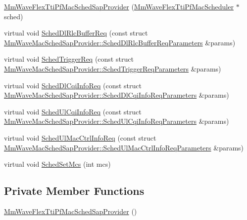 \begin{DoxyCompactItemize}
\item 
\hyperlink{classns3_1_1MmWaveFlexTtiPfMacSchedSapProvider_a828bc790997d2739946319fb5b5c7f0a}{Mm\+Wave\+Flex\+Tti\+Pf\+Mac\+Sched\+Sap\+Provider} (\hyperlink{classns3_1_1MmWaveFlexTtiPfMacScheduler}{Mm\+Wave\+Flex\+Tti\+Pf\+Mac\+Scheduler} $\ast$sched)
\item 
virtual void \hyperlink{classns3_1_1MmWaveFlexTtiPfMacSchedSapProvider_adc673280550b38446e55929c9133e5c8}{Sched\+Dl\+Rlc\+Buffer\+Req} (const struct \hyperlink{structns3_1_1MmWaveMacSchedSapProvider_1_1SchedDlRlcBufferReqParameters}{Mm\+Wave\+Mac\+Sched\+Sap\+Provider\+::\+Sched\+Dl\+Rlc\+Buffer\+Req\+Parameters} \&params)
\item 
virtual void \hyperlink{classns3_1_1MmWaveFlexTtiPfMacSchedSapProvider_a1c7438e1d0ef6529009c46eb471b78d4}{Sched\+Trigger\+Req} (const struct \hyperlink{structns3_1_1MmWaveMacSchedSapProvider_1_1SchedTriggerReqParameters}{Mm\+Wave\+Mac\+Sched\+Sap\+Provider\+::\+Sched\+Trigger\+Req\+Parameters} \&params)
\item 
virtual void \hyperlink{classns3_1_1MmWaveFlexTtiPfMacSchedSapProvider_aa4986d4ed7b33edf36dd767c90407cdb}{Sched\+Dl\+Cqi\+Info\+Req} (const struct \hyperlink{structns3_1_1MmWaveMacSchedSapProvider_1_1SchedDlCqiInfoReqParameters}{Mm\+Wave\+Mac\+Sched\+Sap\+Provider\+::\+Sched\+Dl\+Cqi\+Info\+Req\+Parameters} \&params)
\item 
virtual void \hyperlink{classns3_1_1MmWaveFlexTtiPfMacSchedSapProvider_a58a328f563ba4970a708920c4eb8e4c3}{Sched\+Ul\+Cqi\+Info\+Req} (const struct \hyperlink{structns3_1_1MmWaveMacSchedSapProvider_1_1SchedUlCqiInfoReqParameters}{Mm\+Wave\+Mac\+Sched\+Sap\+Provider\+::\+Sched\+Ul\+Cqi\+Info\+Req\+Parameters} \&params)
\item 
virtual void \hyperlink{classns3_1_1MmWaveFlexTtiPfMacSchedSapProvider_a68160c925a944661b64d5ee22f2d234d}{Sched\+Ul\+Mac\+Ctrl\+Info\+Req} (const struct \hyperlink{structns3_1_1MmWaveMacSchedSapProvider_1_1SchedUlMacCtrlInfoReqParameters}{Mm\+Wave\+Mac\+Sched\+Sap\+Provider\+::\+Sched\+Ul\+Mac\+Ctrl\+Info\+Req\+Parameters} \&params)
\item 
virtual void \hyperlink{classns3_1_1MmWaveFlexTtiPfMacSchedSapProvider_a95d4c779bacff7f7f41860850445f3f6}{Sched\+Set\+Mcs} (int mcs)
\end{DoxyCompactItemize}
\subsection*{Private Member Functions}
\begin{DoxyCompactItemize}
\item 
\hyperlink{classns3_1_1MmWaveFlexTtiPfMacSchedSapProvider_aa4b7eabcdcfc2f6f7b652bb61dea9e39}{Mm\+Wave\+Flex\+Tti\+Pf\+Mac\+Sched\+Sap\+Provider} ()
\end{DoxyCompactItemize}
